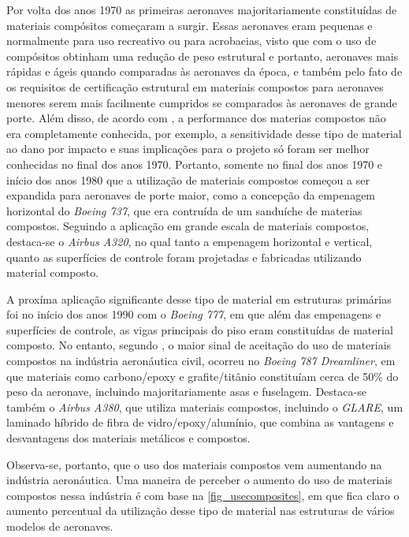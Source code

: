 Por volta dos anos 1970 as primeiras aeronaves majoritariamente constituídas de materiais compósitos começaram a surgir. Essas aeronaves eram pequenas e normalmente para uso recreativo ou para acrobacias, visto que com o uso de compósitos obtinham uma redução de peso estrutural e portanto, aeronaves mais rápidas e ágeis quando comparadas às aeronaves da época, e também pelo fato de os requisitos de certificação estrutural em materiais compostos para aeronaves menores serem mais facilmente cumpridos se comparados às aeronaves de grande porte. Além disso, de acordo com \cite{kassapoglou2013design}, a performance dos materias compostos não era completamente conhecida, por exemplo, a sensitividade desse tipo de material ao dano por impacto e suas implicações para o projeto só foram ser melhor conhecidas no final dos anos 1970. Portanto, somente no final dos anos 1970 e início dos anos 1980 que a utilização de materiais compostos começou a ser expandida para aeronaves de porte maior, como a concepção da empenagem horizontal do \emph{Boeing 737}, que era contruída de um sanduíche de materias compostos. Seguindo a aplicação em grande escala de materiais compostos, destaca-se o \emph{Airbus A320}, no qual tanto a empenagem horizontal e vertical, quanto as superfícies de controle foram projetadas e fabricadas utilizando material composto.

A proxíma aplicação significante desse tipo de material em estruturas primárias foi no início dos anos 1990 com o \emph{Boeing 777}, em que além das empenagens e superfícies de controle, as vigas principais do piso eram constituídas de material composto.
No entanto, segundo \cite{daniel2006engineering}, o maior sinal de aceitação do uso de materiais compostos na indústria aeronáutica civil, ocorreu no \emph{Boeing 787 Dreamliner}, em que materiais como carbono/epoxy e grafite/titânio constituíam cerca de 50\% do peso da aeronave, incluindo majoritariamente asas e fuselagem. Destaca-se também o \emph{Airbus A380}, que utiliza materiais compostos, incluindo o \emph{GLARE}, um laminado híbrido de fibra de vidro/epoxy/alumínio, que combina as vantagens e desvantagens dos materiais metálicos e compostos.

Observa-se, portanto, que o uso dos materiais compostos vem aumentando na indústria aeronáutica. Uma maneira de perceber o aumento do uso de materiais compostos nessa indústria é com base na \autoref{fig_usecomposites}, em que fica claro o aumento percentual da utilização desse tipo de material nas estruturas de vários modelos de aeronaves.

